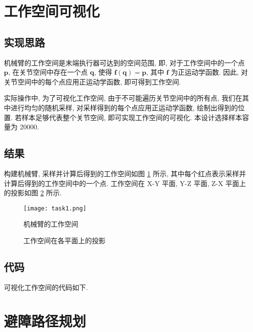 \documentclass{article}
\begin{document}
\section{工作空间可视化}
\subsection{实现思路}
机械臂的工作空间是末端执行器可达到的空间范围, 即, 对于工作空间中的一个点 $\mathbf{p}$, 在关节空间中存在一个点 $\mathbf{q}$, 使得 $\mathbf{f}(\mathbf{q}) = \mathbf{p}$, 其中 $\mathbf{f}$ 为正运动学函数. 因此, 对关节空间中的每个点应用正运动学函数, 即可得到工作空间.\par
实际操作中, 为了可视化工作空间, 由于不可能遍历关节空间中的所有点, 我们在其中进行均匀的随机采样, 对采样得到的每个点应用正运动学函数, 绘制出得到的位置. 若样本足够代表整个关节空间, 即可实现工作空间的可视化. 本设计选择样本容量为 20000.


\subsection{结果}
构建机械臂, 采样并计算后得到的工作空间如图 \ref{workspace} 所示, 其中每个红点表示采样并计算后得到的工作空间中的一个点. 工作空间在 X-Y 平面, Y-Z 平面, Z-X 平面上的投影如图 \ref{projection} 所示.
\medskip
\begin{figure}[H]
    \centering
    \texttt{[image: task1.png]}
    \caption{机械臂的工作空间}
    \label{workspace}
\end{figure}
\medskip
\medskip
\begin{figure}[H]
    \centering
    \hspace{3pt}
    \hspace{3pt}
    \caption{\label{projection}工作空间在各平面上的投影}
\end{figure}
\medskip

\subsection{代码}
可视化工作空间的代码如下.
\medskip
\medskip




\section{避障路径规划}
\end{document}
